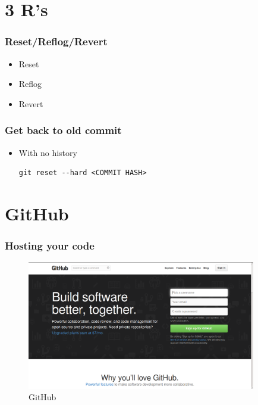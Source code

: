 \documentclass[bigger, presentation]{beamer}
\begin{document}
\section{3 R's}
\label{sec-9}
\begin{frame}
\frametitle{Reset/Reflog/Revert}
\label{sec-9-1}

 
\begin{itemize}
\item Reset
\item Reflog
\item Revert
\end{itemize}
\end{frame}
\begin{frame}[fragile]
\frametitle{Get back to old commit}
\label{sec-9-2}
\begin{itemize}

\item With no history\\
\label{sec-9-2-1}%
\begin{verbatim}
git reset --hard <COMMIT HASH>
\end{verbatim}

\end{itemize} %
\end{frame}
\section{GitHub}
\label{sec-10}
\begin{frame}
\frametitle{Hosting your code}
\label{sec-10-1}



  \begin{figure}[htb]
  \centering
  \includegraphics[width=10cm,angle=0]{./github.png}
  \caption{\label{fig:GitHub}GitHub}
  \end{figure}
\end{frame}
\end{document}
